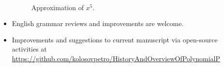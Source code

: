 \begin{itemize}
\begin{figure}[H]
        ~\caption{Approximation of $x^5$.}\label{fig:approximation-n5}
    \end{figure}
    \item English grammar reviews and improvements are welcome.
    \item Improvements and suggestions to current manuscript via open-source activities at
    \url{https://github.com/kolosovpetro/HistoryAndOverviewOfPolynomialP}
\end{itemize}
